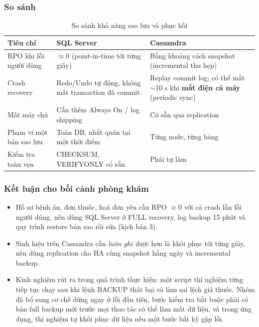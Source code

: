 \subsubsection{So sánh}

\begin{table}[H]
\centering
\caption{So sánh khả năng sao lưu và phục hồi}
\label{tab:backup-compare}
\begin{tabularx}{\linewidth}{|p{3.4cm}|X|X|}
\hline
\textbf{Tiêu chí} & \textbf{SQL Server} & \textbf{Cassandra} \\ \hline
RPO khi lỗi người dùng & $\approx 0$ (point-in-time tới từng giây) & Bằng khoảng cách snapshot (incremental thu hẹp) \\ \hline
Crash recovery & Redo/Undo tự động, không mất transaction đã commit & Replay commit log; có thể mất $\sim$10 s khi \textbf{mất điện cả máy} (periodic sync) \\ \hline
Mất máy chủ & Cần thêm Always On / log shipping & Có sẵn qua replication \\ \hline
Phạm vi một bản sao lưu & Toàn DB, nhất quán tại một thời điểm & Từng node, từng bảng \\ \hline
Kiểm tra toàn vẹn & CHECKSUM, VERIFYONLY có sẵn & Phải tự làm \\ \hline
\end{tabularx}
\end{table}

\subsubsection{Kết luận cho bối cảnh phòng khám}
\begin{itemize}
    \item Hồ sơ bệnh án, đơn thuốc, hoá đơn yêu cầu RPO $\approx 0$ với cả crash lẫn lỗi người dùng, nên dùng SQL Server ở FULL recovery, log backup 15 phút và quy trình restore bản sao rồi sửa (kịch bản 3).
    \item Sinh hiệu trên Cassandra cần \textit{luôn ghi được} hơn là khôi phục tới từng giây, nên dùng replication cho HA cùng snapshot hằng ngày và incremental backup.
    \item Kinh nghiệm rút ra trong quá trình thực hiện: một script thí nghiệm từng tiếp tục chạy sau khi lệnh BACKUP thất bại và làm sai lệch giá thuốc. Nhóm đã bổ sung cơ chế dừng ngay ở lỗi đầu tiên, bước kiểm tra bắt buộc phải có bản full backup mới trước mọi thao tác có thể làm mất dữ liệu, và trong ứng dụng, thí nghiệm tự khôi phục dữ liệu nếu một bước bất kỳ gặp lỗi.
\end{itemize}

